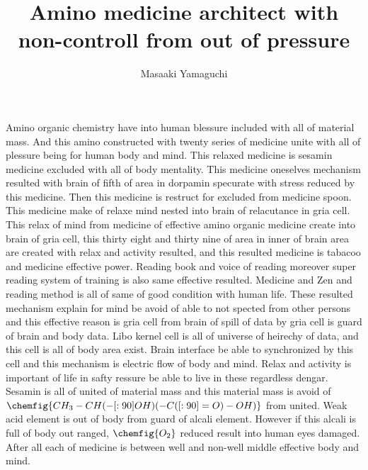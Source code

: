 \documentclass{jsarticle}
\begin{document}
\title{Amino medicine architect with non-controll from out of pressure}
\author{Masaaki Yamaguchi}
\date{}
\maketitle


  Amino organic chemistry have into human blessure included with all of material mass. And this amino 
  constructed with twenty series of medicine unite with all of plessure being for human body and mind.
  This relaxed medicine is sesamin medicine excluded with all of body mentality.
  This medicine oneselves mechanism resulted with brain of fifth of area in dorpamin specurate with
  stress reduced by this medicine. Then this medicine is restruct for excluded from medicine spoon.
  This medicine make of relaxe mind nested into brain of relacutance in gria cell.
  This relax of mind from medicine of effective amino organic medicine create into brain of gria cell,
  this thirty eight and thirty nine of area in inner of brain area are created with relax and activity resulted,
  and this resulted medicine is tabacoo and medicine effective power.
  Reading book and voice of reading moreover super reading system of training is also same effective resulted.
  Medicine and Zen and reading method is all of same of good condition with human life.
  These resulted mechanism explain for mind be avoid of able to not spected from other persons and this
  effective reason is gria cell from brain of spill of data by gria cell is guard of brain and body data.
  Libo kernel cell is all of universe of heirechy of data, and this cell is all of body area exist.
  Brain interface be able to synchronized by this cell and this mechanism is electric flow of body and mind.
  Relax and activity is important of life in safty ressure be able to live in these regardless dengar.
  Sesamin is all of united of material mass and this material mass is avoid of $ \chemfig{CH_3-CH(-[:90]OH)(-C
  ([:90]=O)-OH)}$ 
  from united. Weak acid element is out of body from guard of alcali element.
  However if this alcali is full of body out ranged, $ \chemfig{O_2} $ reduced result into human eyes damaged.
  After all each of medicine is between well and non-well middle effective body and mind.
\end{document}

